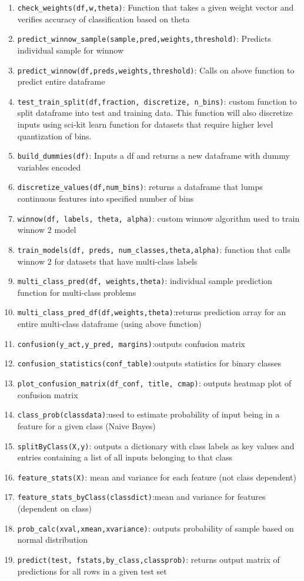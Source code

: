 \documentclass[11pt]{article}
\begin{document}
\begin{enumerate}
\item \verb=check_weights(df,w,theta)=: Function that takes a given weight vector and verifies accuracy of classification based on theta
\item \verb=predict_winnow_sample(sample,pred,weights,threshold)=: Predicts individual sample for winnow
\item \verb=predict_winnow(df,preds,weights,threshold)=: Calls on above function to predict entire dataframe
\item \verb=test_train_split(df,fraction, discretize, n_bins)=: custom function to split dataframe into test and training data. This function will also discretize inputs using sci-kit learn function for datasets that require higher level quantization of bins.
\item \verb=build_dummies(df)=: Inputs a df and returns a new dataframe with dummy variables encoded
\item \verb=discretize_values(df,num_bins)=: returns a dataframe that lumps continuous features into specified number of bins
\item \verb=winnow(df, labels, theta, alpha)=: custom winnow algorithm used to train winnow 2 model
\item \verb=train_models(df, preds, num_classes,theta,alpha)=: function that calls winnow 2 for datasets that have multi-class labels
\item \verb=multi_class_pred(df, weights,theta)=: individual sample prediction function for multi-class problems
\item \verb=multi_class_pred_df(df,weights,theta)=:returns prediction array for an entire multi-class dataframe (using above function)
\item \verb=confusion(y_act,y_pred, margins)=:outputs confusion matrix 
\item \verb=confusion_statistics(conf_table)=:outputs statistics for binary classes
\item \verb=plot_confusion_matrix(df_conf, title, cmap)=: outputs heatmap plot of confusion matrix
\item \verb=class_prob(classdata)=:used to estimate probability of input being in a feature for a given class (Naive Bayes)
\item \verb=splitByClass(X,y)=: outputs a dictionary with class labels as key values and entries containing a list of all inputs belonging to that class
\item \verb=feature_stats(X)=: mean and variance for each feature (not class dependent)
\item \verb=feature_stats_byClass(classdict)=:mean and variance for features (dependent on class)
\item \verb=prob_calc(xval,xmean,xvariance)=: outputs probability of sample based on normal distribution
\item \verb=predict(test, fstats,by_class,classprob)=: returns output matrix of predictions for all rows in a given test set
\end{enumerate}
\end{document}
